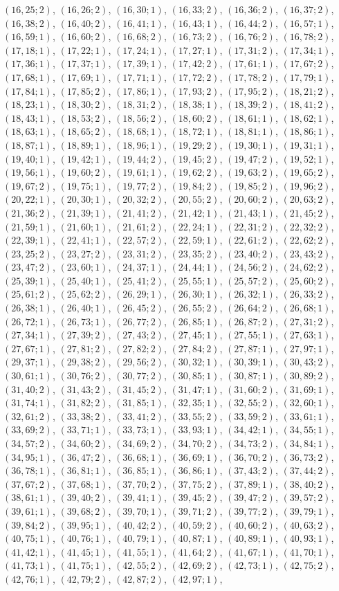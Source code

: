 \documentclass[11pt]{article}
\begin{document}
$(16,25;2)$, $(16,26;2)$, $(16,30;1)$, $(16,33;2)$, $(16,36;2)$, $(16,37;2)$, $(16,38;2)$, $(16,40;2)$, $(16,41;1)$, $(16,43;1)$, $(16,44;2)$, $(16,57;1)$, $(16,59;1)$, $(16,60;2)$, $(16,68;2)$, $(16,73;2)$, $(16,76;2)$, $(16,78;2)$, $(17,18;1)$, $(17,22;1)$, $(17,24;1)$, $(17,27;1)$, $(17,31;2)$, $(17,34;1)$, $(17,36;1)$, $(17,37;1)$, $(17,39;1)$, $(17,42;2)$, $(17,61;1)$, $(17,67;2)$, $(17,68;1)$, $(17,69;1)$, $(17,71;1)$, $(17,72;2)$, $(17,78;2)$, $(17,79;1)$, $(17,84;1)$, $(17,85;2)$, $(17,86;1)$, $(17,93;2)$, $(17,95;2)$, $(18,21;2)$, $(18,23;1)$, $(18,30;2)$, $(18,31;2)$, $(18,38;1)$, $(18,39;2)$, $(18,41;2)$, $(18,43;1)$, $(18,53;2)$, $(18,56;2)$, $(18,60;2)$, $(18,61;1)$, $(18,62;1)$, $(18,63;1)$, $(18,65;2)$, $(18,68;1)$, $(18,72;1)$, $(18,81;1)$, $(18,86;1)$, $(18,87;1)$, $(18,89;1)$, $(18,96;1)$, $(19,29;2)$, $(19,30;1)$, $(19,31;1)$, $(19,40;1)$, $(19,42;1)$, $(19,44;2)$, $(19,45;2)$, $(19,47;2)$, $(19,52;1)$, $(19,56;1)$, $(19,60;2)$, $(19,61;1)$, $(19,62;2)$, $(19,63;2)$, $(19,65;2)$, $(19,67;2)$, $(19,75;1)$, $(19,77;2)$, $(19,84;2)$, $(19,85;2)$, $(19,96;2)$, $(20,22;1)$, $(20,30;1)$, $(20,32;2)$, $(20,55;2)$, $(20,60;2)$, $(20,63;2)$, $(21,36;2)$, $(21,39;1)$, $(21,41;2)$, $(21,42;1)$, $(21,43;1)$, $(21,45;2)$, $(21,59;1)$, $(21,60;1)$, $(21,61;2)$, $(22,24;1)$, $(22,31;2)$, $(22,32;2)$, $(22,39;1)$, $(22,41;1)$, $(22,57;2)$, $(22,59;1)$, $(22,61;2)$, $(22,62;2)$, $(23,25;2)$, $(23,27;2)$, $(23,31;2)$, $(23,35;2)$, $(23,40;2)$, $(23,43;2)$, $(23,47;2)$, $(23,60;1)$, $(24,37;1)$, $(24,44;1)$, $(24,56;2)$, $(24,62;2)$, $(25,39;1)$, $(25,40;1)$, $(25,41;2)$, $(25,55;1)$, $(25,57;2)$, $(25,60;2)$, $(25,61;2)$, $(25,62;2)$, $(26,29;1)$, $(26,30;1)$, $(26,32;1)$, $(26,33;2)$, $(26,38;1)$, $(26,40;1)$, $(26,45;2)$, $(26,55;2)$, $(26,64;2)$, $(26,68;1)$, $(26,72;1)$, $(26,73;1)$, $(26,77;2)$, $(26,85;1)$, $(26,87;2)$, $(27,31;2)$, $(27,34;1)$, $(27,39;2)$, $(27,43;2)$, $(27,45;1)$, $(27,55;1)$, $(27,63;1)$, $(27,67;1)$, $(27,81;2)$, $(27,82;2)$, $(27,84;2)$, $(27,87;1)$, $(27,97;1)$, $(29,37;1)$, $(29,38;2)$, $(29,56;2)$, $(30,32;1)$, $(30,39;1)$, $(30,43;2)$, $(30,61;1)$, $(30,76;2)$, $(30,77;2)$, $(30,85;1)$, $(30,87;1)$, $(30,89;2)$, $(31,40;2)$, $(31,43;2)$, $(31,45;2)$, $(31,47;1)$, $(31,60;2)$, $(31,69;1)$, $(31,74;1)$, $(31,82;2)$, $(31,85;1)$, $(32,35;1)$, $(32,55;2)$, $(32,60;1)$, $(32,61;2)$, $(33,38;2)$, $(33,41;2)$, $(33,55;2)$, $(33,59;2)$, $(33,61;1)$, $(33,69;2)$, $(33,71;1)$, $(33,73;1)$, $(33,93;1)$, $(34,42;1)$, $(34,55;1)$, $(34,57;2)$, $(34,60;2)$, $(34,69;2)$, $(34,70;2)$, $(34,73;2)$, $(34,84;1)$, $(34,95;1)$, $(36,47;2)$, $(36,68;1)$, $(36,69;1)$, $(36,70;2)$, $(36,73;2)$, $(36,78;1)$, $(36,81;1)$, $(36,85;1)$, $(36,86;1)$, $(37,43;2)$, $(37,44;2)$, $(37,67;2)$, $(37,68;1)$, $(37,70;2)$, $(37,75;2)$, $(37,89;1)$, $(38,40;2)$, $(38,61;1)$, $(39,40;2)$, $(39,41;1)$, $(39,45;2)$, $(39,47;2)$, $(39,57;2)$, $(39,61;1)$, $(39,68;2)$, $(39,70;1)$, $(39,71;2)$, $(39,77;2)$, $(39,79;1)$, $(39,84;2)$, $(39,95;1)$, $(40,42;2)$, $(40,59;2)$, $(40,60;2)$, $(40,63;2)$, $(40,75;1)$, $(40,76;1)$, $(40,79;1)$, $(40,87;1)$, $(40,89;1)$, $(40,93;1)$, $(41,42;1)$, $(41,45;1)$, $(41,55;1)$, $(41,64;2)$, $(41,67;1)$, $(41,70;1)$, $(41,73;1)$, $(41,75;1)$, $(42,55;2)$, $(42,69;2)$, $(42,73;1)$, $(42,75;2)$, $(42,76;1)$, $(42,79;2)$, $(42,87;2)$, $(42,97;1)$, 
\end{document}
